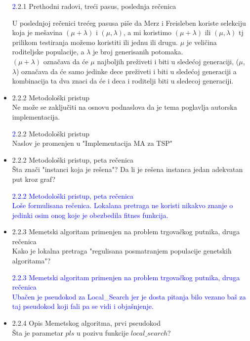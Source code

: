 \documentclass[a4paper]{report}
\newcommand{\odgovor}[1]{\textcolor{blue}{#1}}
\begin{document}
\begin{itemize}
  \odgovor 2.2.1 Prethodni radovi, treći pasus, poslednja rečenica
  
      U poslednjoj rečenici trećeg pasusa piše da Merz i Freisleben koriste selekciju koja je mešavina  $(\mu +\lambda)$ i $(\mu,\lambda)$, a mi koristimo $(\mu +\lambda)$ ili $(\mu,\lambda)$ tj prilikom testiranja možemo koristiti ili jednu ili drugu.
     $\mu$ je veličina roditeljske populacije, a $\lambda$ je broj generisanih potomaka.\\
     $(\mu +\lambda)$ označava da će $\mu$ najboljih preživeti i biti u sledećoj generaciji, ($\mu$, $\lambda$) označava da će samo jedinke dece preživeti i biti u sledećoj generaciji a kombinacija ta dva znaci da će i deca i roditelji biti u sledecoj generaciji.
        
        
        
        
    \item 2.2.2 Metodološki pristup \\
    Ne može se zaključiti na osnovu podnaslova da je tema poglavlja autorska implementacija.
    
    \odgovor 2.2.2 Metodološki pristup \\
    Naslov je promenjen u "Implementacija MA za TSP"
    
    \item 2.2.2 Metodološki pristup, peta rečenica \\
    Šta znači "instanci koja je rešena"? Da li je rešena instanca jedan adekvatan put kroz graf?
  
    \odgovor{ 2.2.2 Metodološki pristup, peta rečenica \\
    Loše formulisana rečenica.
    Lokalana pretraga ne koristi nikakvo znanje o jedinki osim onog koje je obezbedila fitnes funkcija.}
    
    \item 2.2.3 Memetski algoritam primenjen na problem trgovačkog putnika, druga rečenica \\
    Kako je lokalna pretraga "regulisana posmatranjem populacije genetskih algoritama"?
    
    \odgovor{ 2.2.3 Memetski algoritam primenjen na problem trgovačkog putnika, druga rečenica \\
    Ubačen je pseudokod za Local\_Search jer je dosta pitanja bilo vezano baš za taj pseudokod koji fali pa se vidi i objašnjenje.}
    
    \item 2.2.4 Opis Memetskog algoritma, prvi pseudokod \\
    Šta je parametar $pls$ u pozivu funkcije $local\_search$?


\end{itemize}
\end{document}
